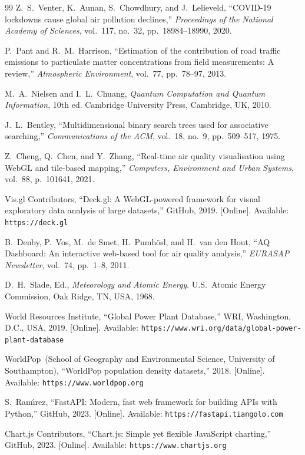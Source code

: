 \documentclass[conference]{IEEEtran}
\begin{document}
\begin{thebibliography}{99}
Z.~S.~Venter, K.~Aunan, S.~Chowdhury, and J.~Lelieveld,
``COVID-19 lockdowns cause global air pollution declines,''
\emph{Proceedings of the National Academy of Sciences},
vol.~117, no.~32, pp.~18984--18990, 2020.

P.~Pant and R.~M.~Harrison,
``Estimation of the contribution of road traffic emissions to
particulate matter concentrations from field measurements:
A review,''
\emph{Atmospheric Environment}, vol.~77, pp.~78--97, 2013.

M.~A.~Nielsen and I.~L.~Chuang,
\emph{Quantum Computation and Quantum Information}, 10th ed.
Cambridge University Press, Cambridge, UK, 2010.

J.~L.~Bentley,
``Multidimensional binary search trees used for associative searching,''
\emph{Communications of the ACM}, vol.~18, no.~9, pp.~509--517, 1975.

Z.~Cheng, Q.~Chen, and Y.~Zhang,
``Real-time air quality visualisation using WebGL and tile-based
mapping,''
\emph{Computers, Environment and Urban Systems}, vol.~88,
p.~101641, 2021.

Vis.gl Contributors,
``Deck.gl: A WebGL-powered framework for visual exploratory data
analysis of large datasets,''
GitHub, 2019.
[Online]. Available: \texttt{https://deck.gl}

B.~Denby, P.~Vos, M.~de Smet, H.~Pumh\"{o}sl, and H.~van den Hout,
``AQ Dashboard: An interactive web-based tool for air quality
analysis,''
\emph{EURASAP Newsletter}, vol.~74, pp.~1--8, 2011.

D.~H.~Slade, Ed.,
\emph{Meteorology and Atomic Energy}.
U.S.~Atomic Energy Commission, Oak Ridge, TN, USA, 1968.

World Resources Institute,
``Global Power Plant Database,''
WRI, Washington, D.C., USA, 2019.
[Online]. Available: \texttt{https://www.wri.org/data/global-power-plant-database}

WorldPop~(School of Geography and Environmental Science,
University of Southampton),
``WorldPop population density datasets,'' 2018.
[Online]. Available: \texttt{https://www.worldpop.org}

S.~Ram\'{\i}rez,
``FastAPI: Modern, fast web framework for building APIs with Python,''
GitHub, 2023.
[Online]. Available: \texttt{https://fastapi.tiangolo.com}

Chart.js Contributors,
``Chart.js: Simple yet flexible JavaScript charting,''
GitHub, 2023.
[Online]. Available: \texttt{https://www.chartjs.org}

\end{thebibliography}
\end{document}
